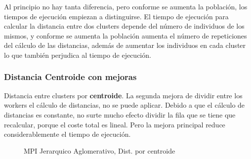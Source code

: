 		Al principio no hay tanta diferencia, pero conforme se aumenta la población, los tiempos de ejecución empiezan a distinguirse. El tiempo de ejecución para calcular la distancia entre dos clusters depende del número de individuos de los mismos, y conforme se aumenta la población aumenta el número de repeticiones del cálculo de las distancias, además de aumentar los individuos en cada cluster lo que también perjudica al tiempo de ejecución.
		
		
		\subsubsection{Distancia Centroide con mejoras}	
		
		Distancia entre clusters por \textbf{centroide}.
		La segunda mejora de dividir entre los workers el cálculo de distancias, no se puede aplicar. Debido a que el cálculo de distancias es constante, no surte mucho efecto dividir la fila que se tiene que recalcular, porque el coste total es lineal. Pero la mejora principal reduce considerablemente el tiempo de ejecución.
		
		\begin{figure}[!h]
		\centering
		\caption{ MPI Jerarquico Aglomerativo, Dist. por centroide}
		\end{figure}

